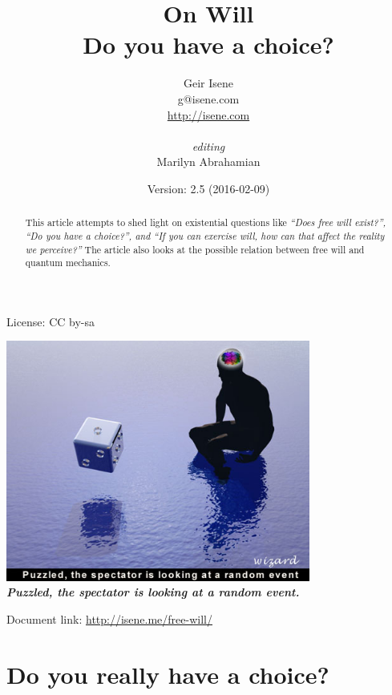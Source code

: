 \documentclass[11pt]{article}
\title{On Will\\{\small Do you have a choice?}}
\author{Geir Isene\\{\small g@isene.com}\\{\small \url{http://isene.com}}\\\\{\small \em{editing}}\\{\small Marilyn Abrahamian}}
\date{{\small Version: 2.5 (2016-02-09)}}
\begin{document}
\maketitle
\begin{center} 
License: CC by-sa
\end{center}

\vspace{20mm}

\begin{center} 
\includegraphics[trim = 0mm 15mm 0mm 0mm, clip, width=100mm]{random}\\
{\bf {\em Puzzled, the spectator is looking at a random event.}}
\end{center}

\vspace{40mm}

\begin{center}
{\small Document link: \url{http://isene.me/free-will/}}
\end{center}

\newpage
\begingroup
\hypersetup{linkcolor=v}
\tableofcontents
\endgroup

\vspace{15mm}

\begin{abstract}
This article attempts to shed light on existential questions like {\em ``Does
free will exist?'', ``Do you have a choice?'', and ``If you can exercise will,
how can that affect the reality we perceive?''} The article also looks at the
possible relation between free will and quantum mechanics.
\end{abstract}

\newpage
\section{Do you really have a choice?}
\end{document}
